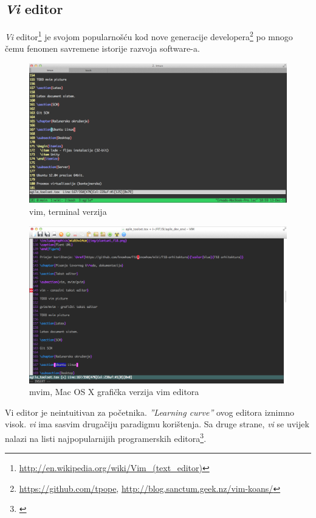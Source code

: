 \documentclass[times, utf8, seminar]{fit}
\begin{document}
\subsection{\emph{Vi} editor} 

\emph{Vi} editor\footnote{\url{http://en.wikipedia.org/wiki/Vim_(text_editor)}} je svojom popularnošću kod nove generacije developera\footnote{\url{https://github.com/tpope}, \url{http://blog.sanctum.geek.nz/vim-koans/}} po mnogo čemu fenomen savremene istorije razvoja software-a.

\begin{figure}[H]
\centering
\includegraphics[width=14cm]{img/vim.png}
\caption{vim, terminal verzija}
\end{figure}

\begin{figure}[H]
\centering
\includegraphics[width=14cm]{img/mvim.png}
\caption{mvim, Mac OS X grafička verzija vim editora}
\end{figure}

Vi editor je neintuitivan za početnika. \emph{''Learning curve''} ovog editora iznimno visok. \emph{vi} ima sasvim drugačiju paradigmu korištenja. Sa druge strane, \emph{vi} se uvijek nalazi na listi najpopularnijih programerskih editora\footnote{\href{http://tutorialzine.com/2012/07/battle-of-the-tools-which-is-the-best-code-editor}{\color{blue}{Pregled programerskih editora}}}.
\end{document}
